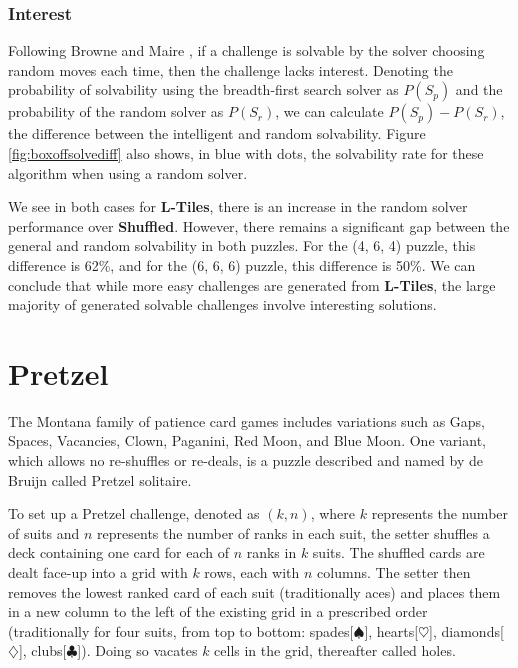 \documentclass[journal]{IEEEtran}
\begin{document}
\subsubsection{Interest}

Following Browne and Maire \cite{MCPUZZLE}, if a challenge is solvable by the solver choosing random moves each time, then the challenge lacks interest. Denoting the probability of solvability using the breadth-first search solver as $P(S_p)$ and the probability of the random solver as $P(S_r)$, we can calculate $P(S_p) - P(S_r)$, the difference between the intelligent and random solvability. Figure \ref{fig:boxoffsolvediff} also shows, in blue with dots, the solvability rate for these algorithm when using a random solver. 

We see in both cases for {\bf L-Tiles}, there is an increase in the random solver performance over {\bf Shuffled}. However, there remains a significant gap between the general and random solvability in both puzzles. For the (4, 6, 4) puzzle, this difference is 62\%, and for the (6, 6, 6) puzzle, this difference is 50\%. We can conclude that while more easy challenges are generated from {\bf L-Tiles}, the large majority of generated solvable challenges involve interesting solutions.

%

\section{Pretzel}
\noindent
The Montana family of patience card games includes variations such as Gaps, Spaces, Vacancies, Clown, Paganini, Red Moon, and Blue Moon. One variant, which allows no re-shuffles or re-deals, is a puzzle described and named by de Bruijn \cite{de1981pretzel} called Pretzel solitaire.

To set up a Pretzel challenge, denoted as $(k, n)$, where $k$ represents the number of suits and $n$ represents the number of ranks in each suit, the setter shuffles a deck containing one card for each of $n$ ranks in $k$ suits. The shuffled cards are dealt face-up into a grid with $k$ rows, each with $n$ columns. The setter then removes the lowest ranked card of each suit (traditionally aces) and places them in a new column to the left of the existing grid in a prescribed order (traditionally for four suits, from top to bottom: spades[$\spadesuit$], hearts[$\heartsuit$], diamonds[$\diamondsuit$], clubs[$\clubsuit$]). Doing so vacates $k$ cells in the grid, thereafter called holes. 
%
\end{document}
